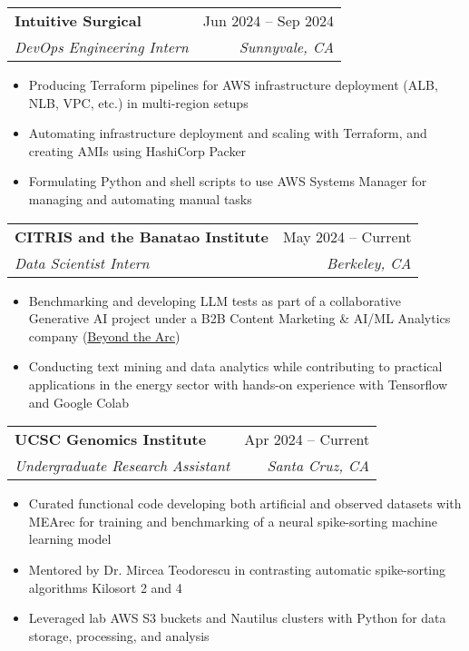 \documentclass[letterpaper,11pt]{article}
\makeatletter
\newcommand{\resumeItem}[1]{
  \item\small{
    {#1 \vspace{-2pt}}
  }
}
\newcommand{\resumeSubheading}[4]{
  \vspace{-2pt}\item
    \begin{tabular*}{0.97\textwidth}[t]{l@{\extracolsep{\fill}}r}
      \textbf{#1} & #2 \\
      \textit{\small#3} & \textit{\small #4} \\
    \end{tabular*}\vspace{-7pt}
}
\newcommand{\resumeItemListStart}{\begin{itemize}}
\newcommand{\resumeItemListEnd}{\end{itemize}\vspace{-5pt}}
\makeatother
\begin{document}
\resumeSubheading
{Intuitive Surgical}{Jun 2024 -- Sep 2024}
{DevOps Engineering Intern}{Sunnyvale, CA}
\resumeItemListStart
\resumeItem{Producing Terraform pipelines for AWS infrastructure deployment (ALB, NLB, VPC, etc.) in multi-region setups}
\resumeItem{Automating infrastructure deployment and scaling with Terraform, and creating AMIs using HashiCorp Packer}
\resumeItem{Formulating Python and shell scripts to use AWS Systems Manager for managing and automating manual tasks}
\resumeItemListEnd

\resumeSubheading
{CITRIS and the Banatao Institute}{May 2024 -- Current}
{Data Scientist Intern}{Berkeley, CA}
\resumeItemListStart
\resumeItem{Benchmarking and developing LLM tests as part of a collaborative Generative AI project under a B2B Content Marketing \& AI/ML Analytics company (\color[HTML]{0000EE}\href{https://beyondthearc.com}{Beyond the Arc})}
\resumeItem{Conducting text mining and data analytics while contributing to practical applications in the energy sector with hands-on experience with Tensorflow and Google Colab}
\resumeItemListEnd

\resumeSubheading
{UCSC Genomics Institute}{Apr 2024 -- Current}
{Undergraduate Research Assistant}{Santa Cruz, CA}
\resumeItemListStart
\resumeItem{Curated functional code developing both artificial and observed datasets with MEArec for training and benchmarking of a neural spike-sorting machine learning model}
\resumeItem{Mentored by Dr. Mircea Teodorescu in contrasting automatic spike-sorting algorithms Kilosort 2 and 4}
\resumeItem{Leveraged lab AWS S3 buckets and Nautilus clusters with Python for data storage, processing, and analysis}
\resumeItemListEnd


\end{document}
